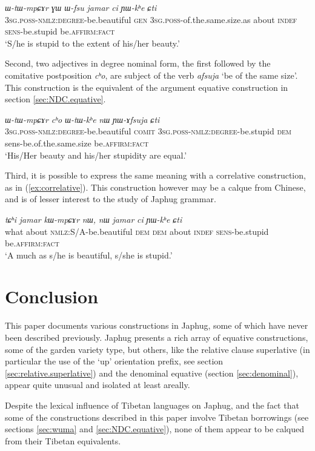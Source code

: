 \documentclass[oneside,a4paper,11pt]{article}
\newcommand{\ipa}[1]{{\phon\textit{#1}}}
\newcommand{\forme}[2]{\ipa{#1} `#2'}
\begin{document}
\begin{exe}
\ex 
\gll 
\ipa{ɯ-tɯ-mpɕɤr} \ipa{ɣɯ} 	\ipa{ɯ-fsu} 	\ipa{jamar} 	\ipa{ci} 	\ipa{ɲɯ-kʰe} 	\ipa{ɕti} \\
\textsc{3sg.poss-nmlz:degree}-be.beautiful \textsc{gen} \textsc{3sg.poss}-of.the.same.size.as about \textsc{indef} \textsc{sens}-be.stupid be.\textsc{affirm:fact} \\
\glt `S/he is stupid to the extent of his/her beauty.'
\end{exe}

Second, two adjectives in degree nominal form, the first followed by the comitative postposition \ipa{cʰo}, are subject of the verb \forme{afsuja}{be of the same size}. This construction is the equivalent of the argument equative construction in section \ref{sec:NDC.equative}.

\begin{exe}
\ex \label{ex:YAfsuja}
\gll 
\ipa{ɯ-tɯ-mpɕɤr} 	\ipa{cʰo} 	\ipa{ɯ-tɯ-kʰe} 	\ipa{nɯ} 	\ipa{ɲɯ-ɤfsuja} 	\ipa{ɕti} \\
\textsc{3sg.poss-nmlz:degree}-be.beautiful \textsc{comit} \textsc{3sg.poss-nmlz:degree}-be.stupid \textsc{dem} sens-be.of.the.same.size be.\textsc{affirm:fact} \\
\glt `His/Her beauty and his/her stupidity are equal.'
\end{exe}

Third, it is possible to express the same meaning with a correlative construction, as in (\ref{ex:correlative}). This construction however may be a calque from Chinese, and is of lesser interest to the study of Japhug grammar.

\begin{exe}
\ex \label{ex:correlative}
\gll 
\ipa{tɕʰi} 	\ipa{jamar} 	\ipa{kɯ-mpɕɤr} 	\ipa{nɯ,} 	\ipa{nɯ} 	\ipa{jamar} 	\ipa{ci} 	\ipa{ɲɯ-kʰe} 	\ipa{ɕti} \\
what about \textsc{nmlz}:S/A-be.beautiful \textsc{dem} \textsc{dem} about \textsc{indef} \textsc{sens}-be.stupid be.\textsc{affirm:fact} \\
\glt `A much as s/he is beautiful, s/she is stupid.'
\end{exe}



\section*{Conclusion}
This paper documents various constructions in Japhug, some of which have never been described previously. Japhug presents a rich array of equative constructions, some of the garden variety type, but others, like the relative clause superlative (in particular the use of the `up' orientation prefix, see section \ref{sec:relative.superlative}) and the denominal equative (section \ref{sec:denominal}), appear quite unusual and isolated at least areally.

Despite the lexical influence of Tibetan languages on Japhug, and the fact that some of the constructions described in this paper involve Tibetan borrowings (see sections \ref{sec:wuma} and \ref{sec:NDC.equative}), none of them appear to be calqued from their Tibetan equivalents.



\end{document}
